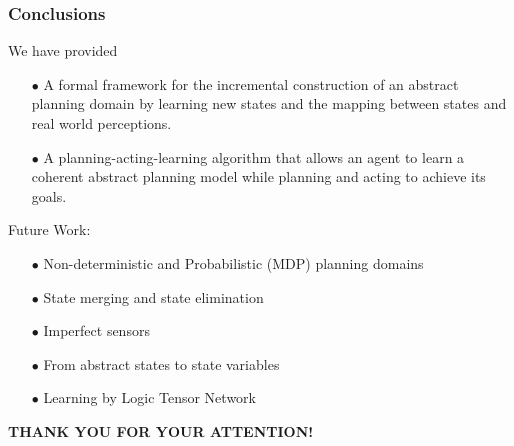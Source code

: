 \documentclass{beamer}
\begin{document}
\begin{frame}
\frametitle{Conclusions}

We have provided
\begin{itemize}
\item[$\bullet$]
A formal framework for the incremental 
construction of an abstract planning domain by learning new states
and the mapping between states and real world perceptions.
\item[$\bullet$]
A planning-acting-learning algorithm that allows an agent to learn
a coherent abstract planning model while planning and acting to achieve its
goals.
\end{itemize}

\pause
{\color {red}
Future Work:}
\begin{itemize}
\item[$\bullet$]
{\color {red}
Non-deterministic and Probabilistic (MDP) planning domains}
\item[$\bullet$]
{\color {red}
State merging and state elimination}
\item[$\bullet$] 
{\color {red} Imperfect sensors}
\item[$\bullet$] 
{\color {red} From abstract states to state variables}
\item[$\bullet$] 
{\color {red} Learning by Logic Tensor Network}
\end{itemize}

\end{frame}

\begin{frame}
\begin{center}
\Large{
{\color {red} {\bf THANK YOU FOR YOUR ATTENTION!}}}    
\end{center}
\end{frame}
\end{document}
